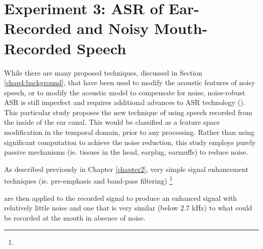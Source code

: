 % 
% 
% 
% 
% 





\section{Experiment 3: ASR of Ear-Recorded and Noisy Mouth-Recorded Speech}\label{expt3}

While there are many proposed techniques, discussed in Section \ref{chap4:background}, that have been used to modify the acoustic features of noisy speech, or to modify the acoustic model to compensate for noise, noise-robust ASR is still imperfect and requires additional advances to ASR technology (\cite{zhang:17}).  This particular study proposes the new technique of using speech recorded from the inside of the ear canal.  This would be classified as a feature space modification in the temporal domain, prior to any processing.  Rather than using significant computation to achieve the noise reduction, this study employs purely passive mechanisms (ie. tissues in the head, earplug, earmuffs) to reduce noise.  

As described previously in Chapter \ref{chapter2}, very simple signal enhancement techniques (ie. pre-emphasis and band-pass filtering) \DIFdelbegin \footnote{} %
\addtocounter{footnote}{-1}%
\DIFdelend are then applied to the recorded signal to produce an enhanced signal with relatively little noise and one that is very similar (below 2.7 kHz) to what could be recorded at the mouth in absence of noise.  \DIFaddbegin {}\DIFaddend 

